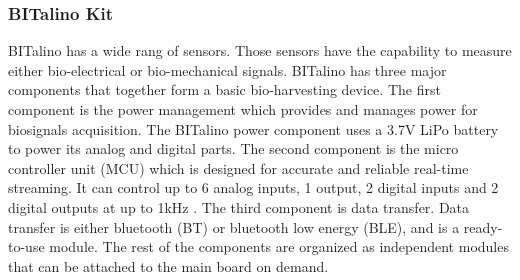         \subsubsection{BITalino Kit}
            BITalino has a wide rang of sensors. Those sensors have the capability to measure either bio-electrical or bio-mechanical signals. BITalino has three major components that together form a basic bio-harvesting device. The first component is the power management which provides and manages power for biosignals acquisition. The BITalino power component uses a 3.7V LiPo battery to power its analog and digital parts. The second component is the micro controller unit (MCU) which is designed for accurate and reliable real-time streaming. It can control up to 6 analog inputs, 1 output, 2 digital inputs and 2 digital outputs at up to 1kHz \citep{BITalino_MCU}. The third component is data transfer. Data transfer is either bluetooth (BT) or bluetooth low energy (BLE), and is a ready-to-use module. The rest of the components are organized as independent modules that can be attached to the main board on demand.
            
